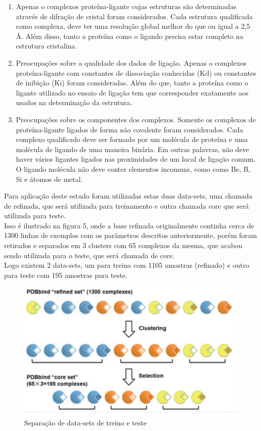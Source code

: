 \documentclass[tcc, capa]{texucpel}
\begin{document}
\begin{enumerate}
\item Apenas o complexos proteína-ligante cujas estruturas são determinadas através de difração de cristal foram considerados. Cada estrutura qualificada como complexa, deve ter uma resolução global melhor do que ou igual a 2,5 Å.
 Além disso, tanto a proteína como o ligando precisa estar completo na estrutura cristalina.
\item Preocupações sobre a qualidade dos dados de ligação. Apenas o complexos proteína-ligante com constantes de dissociação conhecidas (Kd) ou constantes de inibição (Ki) foram consideradas. Além do que, tanto a proteína como o ligante utilizado no ensaio de ligação tem que corresponder exatamente aos usados na determinação da estrutura.
\item Preocupações sobre os componentes dos complexos. Somente os complexos de proteína-ligante ligados de forma não covalente foram considerados. Cada complexo qualificado deve ser formado por um molécula de proteína e uma molécula de ligando de uma maneira binária. Em outras palavras, não deve haver vários ligantes ligados nas proximidades de um local de ligação comum. O ligando molécula não deve conter elementos incomuns, como como Be, B, Si e átomos de metal.
\end{enumerate}

Para aplicação deste estudo foram utilizadas estas duas data-sets, uma chamada de refinada, que será utilizada para treinamento e outra chamada core que será utilizada para teste. \\Isso é ilustrado na figura 5, onde a base refinada originalmente continha cerca de 1300 linhas de exemplos com os parâmetros descritos anteriormente, porém foram retirados e separados em 3 clusters com 65 complexos da mesma, que acabou sendo utilizada para o teste, que será chamada de core. \\Logo existem  2 data-sets, um para treino com 1105 amostras (refinado) e outro para teste com 195 amostras para teste. 

    \begin{figure}[h]
	\centering
    \includegraphics[width=0.90\linewidth]{imagens/data-set.png}
	\caption{Separação de data-sets de treino e teste}
	\end{figure}
\end{document}

